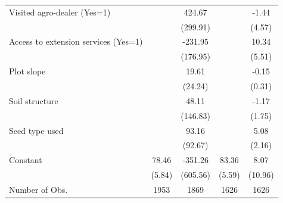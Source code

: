 {\begin{tabular}{l*{4}{c}}
Visited agro-dealer (Yes=1)&                  &   424.67         &                  &    -1.44         \\
                &                  & (299.91)         &                  &   (4.57)         \\
Access to extension services (Yes=1)&                  &  -231.95         &                  &    10.34\sym{*}  \\
                &                  & (176.95)         &                  &   (5.51)         \\
Plot slope      &                  &    19.61         &                  &    -0.15         \\
                &                  &  (24.24)         &                  &   (0.31)         \\
Soil structure  &                  &    48.11         &                  &    -1.17         \\
                &                  & (146.83)         &                  &   (1.75)         \\
Seed type used  &                  &    93.16         &                  &     5.08\sym{**} \\
                &                  &  (92.67)         &                  &   (2.16)         \\
Constant        &    78.46\sym{***}&  -351.26         &    83.36\sym{***}&     8.07         \\
                &   (5.84)         & (605.56)         &   (5.59)         &  (10.96)         \\
\hline
Number of Obs.  &     1953         &     1869         &     1626         &     1626         \\
\hline\hline
\end{tabular}
}
